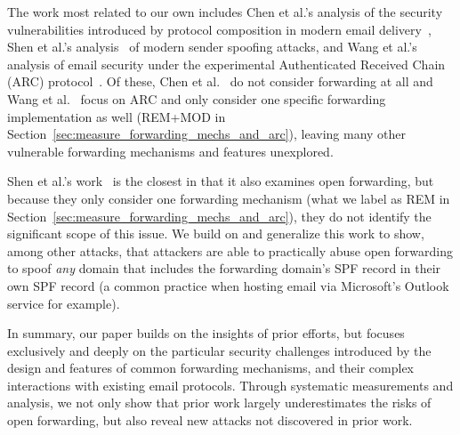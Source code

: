 The work most related to our own includes Chen et al.'s analysis of
the security vulnerabilities introduced by protocol composition in
modern email delivery~\cite{chen2020composition}, Shen et al.'s
analysis~\cite{shen2020weak} of modern sender spoofing attacks, and Wang et al.'s~\cite{wang2022revisiting} analysis of email security under the experimental Authenticated Received Chain (ARC) protocol~\cite{rfc8617}.
Of these, Chen et al.~\cite{chen2020composition} do not consider forwarding at all and Wang et al.~\cite{wang2022revisiting} focus on ARC and only consider one specific forwarding implementation as well (REM+MOD in Section~\ref{sec:measure_forwarding_mechs_and_arc}), leaving many other vulnerable forwarding mechanisms and features unexplored.

Shen et al.'s work~\cite{shen2020weak} is the closest in that it also
examines open forwarding, but because they only consider one
forwarding mechanism (what we label as REM in
Section~\ref{sec:measure_forwarding_mechs_and_arc}), they do not
identify the significant scope of this issue.  We build on and
generalize this work to show, among other attacks, that attackers are
able to practically abuse open forwarding to spoof \emph{any} domain
that includes the forwarding domain's SPF record in their own SPF record (a
common practice when hosting email via Microsoft's Outlook service for example).



In summary, our paper builds on the insights of prior efforts, but focuses exclusively and deeply on the particular security challenges introduced by the design and features of common forwarding mechanisms, and their complex interactions with existing email protocols. Through systematic measurements and analysis, we not only show that prior work largely underestimates the risks of open forwarding,
but also reveal new attacks not discovered in prior work.



